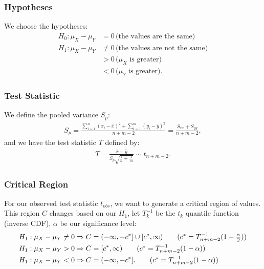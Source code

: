 \documentclass[a4paper, 12pt, twoside]{article}
\begin{document}
\subsubsection{Hypotheses}

We choose the hypotheses:
\begin{align*}
    H_0 : \mu_X - \mu_Y & = 0 \, \text{(the values are the same)}        \\
    H_1 : \mu_X - \mu_Y & \neq 0 \, \text{(the values are not the same)} \\
                        & > 0 \, \text{($\mu_X$ is greater)}             \\
                        & < 0 \, \text{($\mu_Y$ is greater)}.
\end{align*}

\subsubsection{Test Statistic}

We define the pooled variance $S_p$:
\begin{align*}
    S_p = \frac{\sum_{i = 1}^n (x_i - \overline{x})^2
        + \sum_{i = 1}^m (y_i - \overline{y})^2}{n + m - 2}
        = \frac{S_{xx} + S_{yy}}{n + m - 2},
\end{align*}
and we have the test statistic $T$ defined by:
\begin{align*}
    T = \frac{\overline{x} - \overline{y}}
    {S_p\sqrt{\frac{1}{n} + \frac{1}{m}}} \sim t_{n + m - 2}.
\end{align*}

\subsubsection{Critical Region}

For our observed test statistic $t_{obs}$, we want to generate a
critical region of values. This region $C$ changes based on our
$H_1$, let $T^{-1}_k$ be the $t_k$ quantile function (inverse CDF),
$\alpha$ be our significance level:
\begin{align*}
    H_1 : \mu_X - \mu_Y \neq 0 & \Rightarrow
    C = (-\infty, -c^*] \cup [c^*, \infty)
    \tag{$ c^* = T^{-1}_{n + m - 2}(1 - \frac{\alpha}{2}) $}         \\
    H_1 : \mu_X - \mu_Y > 0    & \Rightarrow
    C = [c^*, \infty) \tag{$ c^* = T^{-1}_{n + m - 2}(1 - \alpha) $} \\
    H_1 : \mu_X - \mu_Y < 0    & \Rightarrow C = (-\infty, -c^*].
    \tag{$ c^* = T^{-1}_{n + m - 2}(1 - \alpha) $}
\end{align*}
\end{document}
